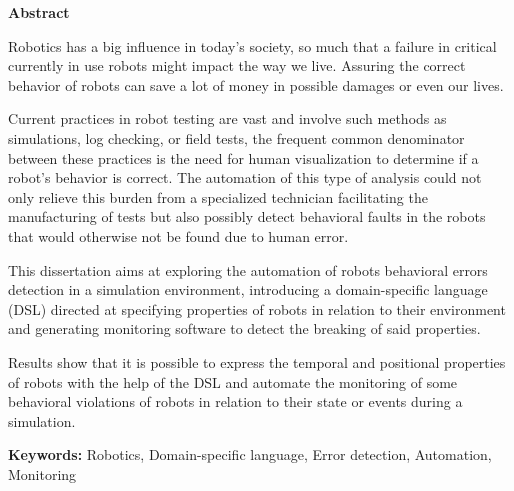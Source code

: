 \vspace*{2cm}
\begin{center}
\Large \bf Abstract
\end{center}
\vspace*{1cm} \setlength{\baselineskip}{0.6cm}

Robotics has a big influence in today's society, so much that a failure in critical currently in use robots might impact the way we live. Assuring the correct behavior of robots can save a lot of money in possible damages or even our lives.

Current practices in robot testing are vast and involve such methods as simulations, log checking, or field tests, the frequent common denominator between these practices is the need for human visualization to determine if a robot's behavior is correct. The automation of this type of analysis could not only relieve this burden from a specialized technician facilitating the manufacturing of tests but also possibly detect behavioral faults in the robots that would otherwise not be found due to human error.

This dissertation aims at exploring the automation of robots behavioral errors detection in a simulation environment, introducing a domain-specific language (DSL) directed at specifying properties of robots in relation to their environment and generating monitoring software to detect the breaking of said properties.

Results show that it is possible to express the temporal and positional properties of robots with the help of the DSL and automate the monitoring of some behavioral violations of robots in relation to their state or events during a simulation.

\vfill

\begin{flushleft}
\textbf{Keywords:}
Robotics, Domain-specific language, Error detection, Automation, Monitoring
\end{flushleft}
